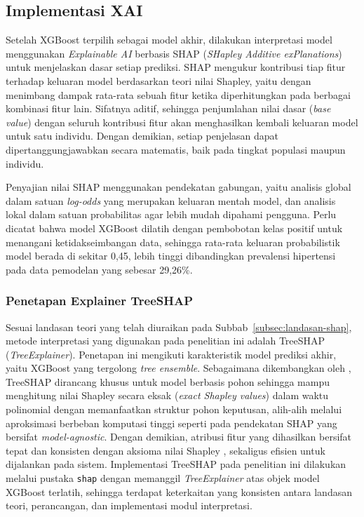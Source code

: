 \subsection{Implementasi XAI}
\label{subsec:implementasi-xai}

Setelah XGBoost terpilih sebagai model akhir, dilakukan interpretasi model menggunakan \emph{Explainable AI} berbasis SHAP (\emph{SHapley Additive exPlanations}) untuk menjelaskan dasar setiap prediksi. SHAP mengukur kontribusi tiap fitur terhadap keluaran model berdasarkan teori nilai Shapley, yaitu dengan menimbang dampak rata-rata sebuah fitur ketika diperhitungkan pada berbagai kombinasi fitur lain. Sifatnya aditif, sehingga penjumlahan nilai dasar (\emph{base value}) dengan seluruh kontribusi fitur akan menghasilkan kembali keluaran model untuk satu individu. Dengan demikian, setiap penjelasan dapat dipertanggungjawabkan secara matematis, baik pada tingkat populasi maupun individu.

Penyajian nilai SHAP menggunakan pendekatan gabungan, yaitu analisis global dalam satuan \emph{log-odds} yang merupakan keluaran mentah model, dan analisis lokal dalam satuan probabilitas agar lebih mudah dipahami pengguna. Perlu dicatat bahwa model XGBoost dilatih dengan pembobotan kelas positif untuk menangani ketidakseimbangan data, sehingga rata-rata keluaran probabilistik model berada di sekitar 0,45, lebih tinggi dibandingkan prevalensi hipertensi pada data pemodelan yang sebesar 29,26\%.

\subsubsection{Penetapan Explainer TreeSHAP}

Sesuai landasan teori yang telah diuraikan pada Subbab~\ref{subsec:landasan-shap}, metode interpretasi yang digunakan pada penelitian ini adalah TreeSHAP (\emph{TreeExplainer}). Penetapan ini mengikuti karakteristik model prediksi akhir, yaitu XGBoost yang tergolong \emph{tree ensemble}. Sebagaimana dikembangkan oleh \textcite{Lundberg2020TreeSHAP}, TreeSHAP dirancang khusus untuk model berbasis pohon sehingga mampu menghitung nilai Shapley secara eksak (\emph{exact Shapley values}) dalam waktu polinomial dengan memanfaatkan struktur pohon keputusan, alih-alih melalui aproksimasi berbeban komputasi tinggi seperti pada pendekatan SHAP yang bersifat \emph{model-agnostic}. Dengan demikian, atribusi fitur yang dihasilkan bersifat tepat dan konsisten dengan aksioma nilai Shapley \autocite{Lundberg2017Unified}, sekaligus efisien untuk dijalankan pada sistem. Implementasi TreeSHAP pada penelitian ini dilakukan melalui pustaka \texttt{shap} dengan memanggil \emph{TreeExplainer} atas objek model XGBoost terlatih, sehingga terdapat keterkaitan yang konsisten antara landasan teori, perancangan, dan implementasi modul interpretasi.

